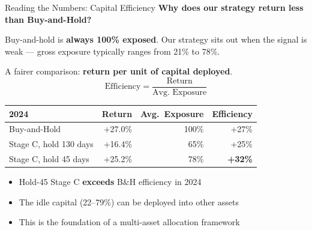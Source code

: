 \documentclass[aspectratio=169]{beamer}
\begin{document}
\begin{frame}{Reading the Numbers: Capital Efficiency}
  \textbf{Why does our strategy return less than Buy-and-Hold?}

  \vspace{0.6em}
  Buy-and-hold is \textbf{always 100\% exposed}. Our strategy sits out when
  the signal is weak — gross exposure typically ranges from 21\% to 78\%.

  \vspace{0.6em}
  A fairer comparison: \textbf{return per unit of capital deployed}.
  \[
    \text{Efficiency} = \frac{\text{Return}}{\text{Avg. Exposure}}
  \]

  \vspace{0.5em}
  \begin{tabular}{lrrr}
    \toprule
    2024 & Return & Avg.\ Exposure & Efficiency \\
    \midrule
    Buy-and-Hold            & +27.0\% & 100\% & +27\% \\
    Stage C, hold 130 days  & +16.4\% &  65\% & +25\% \\
    Stage C, hold 45 days   & +25.2\% &  78\% & \textbf{+32\%} \\
    \bottomrule
  \end{tabular}

  \vspace{0.6em}
  \begin{itemize}
    \item Hold-45 Stage C \textbf{exceeds} B\&H efficiency in 2024
    \item The idle capital (22--79\%) can be deployed into other assets
    \item This is the foundation of a multi-asset allocation framework
  \end{itemize}
\end{frame}
\end{document}
